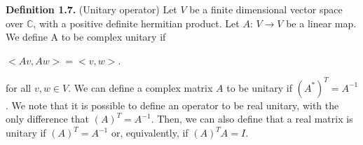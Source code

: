 \documentclass[12pt]{report}
\begin{document}
\begin{minipage}{1\textwidth}
    	\textbf{Definition 1.7.} (Unitary operator) Let $V$ be  a finite dimensional vector space over $\mathbb{C}$, with a positive definite hermitian product. Let $A$: $V \rightarrow V$ be a linear map. We define A to be complex unitary if \newline
    	
    	\begin{center}
    		$<Av,Aw> = <v,w>$.
    	\end{center}
    	
    	for all $v,w \in V$. We can define a complex matrix $A$ to be unitary if $ (A^*)^T=A^{-1}$. We note that it is possible to define an operator to be real unitary, with the only difference that $(A)^T = A^{-1}$. Then, we can also define that a real matrix is unitary if $(A)^T = A^{-1}$ or, equivalently, if $(A)^T A=I$.\newline
    	
    \end{minipage}  	
	
\end{document}
